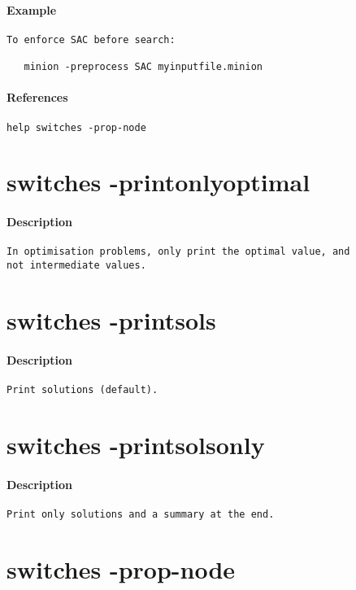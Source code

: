 \paragraph{Example}
{\footnotesize
\begin{verbatim}
To enforce SAC before search:

   minion -preprocess SAC myinputfile.minion
\end{verbatim}
}
\paragraph{References}
{\footnotesize
\begin{verbatim}
help switches -prop-node
\end{verbatim}
}
\section{switches -printonlyoptimal}
\paragraph{Description}
{\footnotesize
\begin{verbatim}
In optimisation problems, only print the optimal value, and
not intermediate values.
\end{verbatim}
}
\section{switches -printsols}
\paragraph{Description}
{\footnotesize
\begin{verbatim}
Print solutions (default).
\end{verbatim}
}
\section{switches -printsolsonly}
\paragraph{Description}
{\footnotesize
\begin{verbatim}
Print only solutions and a summary at the end.
\end{verbatim}
}
\section{switches -prop-node}
